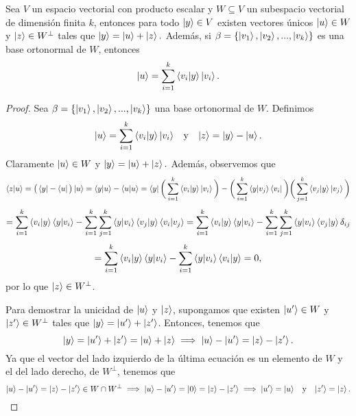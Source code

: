 \documentclass[12pt,dvipsnames]{article}
\newenvironment{teorema}[2][Teorema]{\begin{trivlist}
\item[\hskip \labelsep {\bfseries #1}\hskip \labelsep {\bfseries #2.}]}{\end{trivlist}}
\begin{document}
\begin{teorema} {13.1.1}
    Sea $V$ un espacio vectorial con producto escalar y $W\subseteq V$ un subespacio vectorial de dimensión finita $k$, entonces para todo $\ket{y}\in V$ existen vectores únicos $\ket{u}\in W$ y $\ket{z}\in W^{\perp}$ tales que $\ket{y}=\ket{u}+\ket{z}.$ Además, si $\beta=\{\ket{v_1},\ket{v_2},...,\ket{v_k}\}$ es una base ortonormal de $W$, entonces $$\ket{u}=\sum_{i=1}^k \braket{v_i|y}\ket{v_i}.$$
    \begin{proof}
        Sea $\beta=\{\ket{v_1},\ket{v_2},...,\ket{v_k}\}$ una base ortonormal de $W$. Definimos \[
            \ket{u}=\sum_{i=1}^k\braket{v_i|y}\ket{v_i}\hspace{3mm}\text{y}\hspace{3mm}\ket{z}=\ket{y}-\ket{u}
        .\] \noindent Claramente $\ket{u}\in W$ y $\ket{y}=\ket{u}+\ket{z}.$ Además, observemos que \[
        \braket{z|u}=\big(\bra{y}-\bra{u}\big)\ket{u}=\braket{y|u}-\braket{u|u}=\bra{y}\bigg(\sum_{i=1}^k\braket{v_i|y}\ket{v_i}\bigg)-\bigg(\sum_{i=1}^k\braket{y|v_j}\bra{v_i}\bigg)\bigg(\sum_{j=1}^k \braket{v_j|y}\ket{v_j}\bigg)\] \[
    = \sum_{i=1}^k\braket{v_i|y}\braket{y|v_i}-\sum_{i=1}^k\sum_{j=1}^k\braket{y|v_i}\braket{v_j|y}\braket{v_i|v_j}=\sum_{i=1}^k\braket{v_i|y}\braket{y|v_i}-\sum_{i=1}^k\sum_{j=1}^k\braket{y|v_i}\braket{v_j|y}\delta_{ij}\] \[=\sum_{i=1}^k\braket{v_i|y}\braket{y|v_i}-\sum_{i=1}^k\braket{y|v_i}\braket{v_i|y}=0
,\] \noindent por lo que $\ket{z}\in W^{\perp}$. 

\vspace{3mm}
Para demostrar la unicidad de $\ket{u}$ y $\ket{z}$, supongamos que existen $\ket{u'}\in W$ y $\ket{z'}\in W^{\perp}$ tales que $\ket{y}=\ket{u'}+\ket{z'}$. Entonces, tenemos que \[
    \ket{y}=\ket{u'}+\ket{z'}=\ket{u}+\ket{z}\implies \ket{u}-\ket{u'}=\ket{z}-\ket{z'}
.\] \noindent Ya que el vector del lado izquierdo de la última ecuación es un elemento de $W$ y el del lado derecho, de $W^{\perp}$, tenemos que \[
\ket{u}-\ket{u'}=\ket{z}-\ket{z'}\in W\cap W^{\perp} \implies \ket{u}-\ket{u'}=\ket{0}=\ket{z}-\ket{z'}\implies \ket{u'}=\ket{u}\hspace{3mm} \text{y}\hspace{3mm} \ket{z'}=\ket{z}
.\] 
    \end{proof}
\end{teorema}
\end{document}
